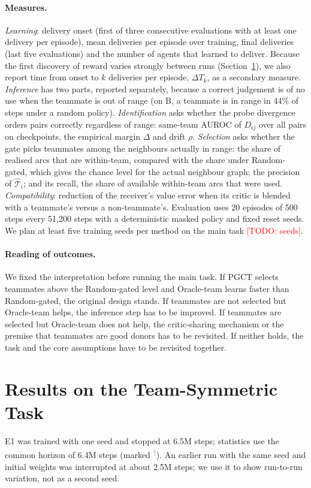 \documentclass{article}
\theoremstyle{remark}
\newcommand{\todo}[1]{\textcolor{red}{[TODO: #1]}}
\newcommand{\pilot}{\textsuperscript{\textcolor{gray}{$\dagger$}}}
\newcommand{\ours}{PGCT}
\begin{document}
\paragraph{Measures.} \emph{Learning}: delivery onset (first of three consecutive evaluations with at least one delivery per
episode), mean deliveries per episode over training, final deliveries (last five evaluations) and the number of agents that
learned to deliver. Because the first discovery of reward varies strongly between runs (Section~\ref{sec:e1}), we also report
time from onset to $k$ deliveries per episode, $\Delta T_k$, as a secondary measure. \emph{Inference} has two parts, reported
separately, because a correct judgement is of no use when the teammate is out of range (on B, a teammate is in range in 44\% of
steps under a random policy). \emph{Identification} asks whether the probe divergence orders pairs correctly regardless of range:
same-team AUROC of $D_{ij}$ over all pairs on checkpoints, the empirical margin $\Delta$ and drift $\rho$. \emph{Selection} asks
whether the gate picks teammates among the neighbours actually in range: the share of realised arcs that are within-team,
compared with the share under Random-gated, which gives the chance level for the actual neighbour graph; the precision of
$\hat{\mathcal{T}}_i$; and its recall, the share of available within-team arcs that were used. \emph{Compatibility}: reduction of the receiver's value error when its critic is blended with a teammate's
versus a non-teammate's. Evaluation uses 20 episodes of 500 steps every 51{,}200 steps with a deterministic masked policy and
fixed reset seeds. We plan at least five training seeds per method on the main task \todo{seeds}.

\paragraph{Reading of outcomes.} We fixed the interpretation before running the main task. If \ours{} selects teammates above
the Random-gated level and Oracle-team learns faster than Random-gated, the original design stands. If teammates are not
selected but Oracle-team helps, the inference step has to be improved. If teammates are selected but Oracle-team does not help,
the critic-sharing mechanism or the premise that teammates are good donors has to be revisited. If neither holds, the task and
the core assumptions have to be revisited together.

\section{Results on the Team-Symmetric Task}
\label{sec:e1}
E1 was trained with one seed and stopped at 6.5M steps; statistics use the common horizon of 6.4M steps (marked \pilot).
An earlier run with the same seed and initial weights was interrupted at about 2.5M steps; we use it to show run-to-run
variation, not as a second seed.
\end{document}
